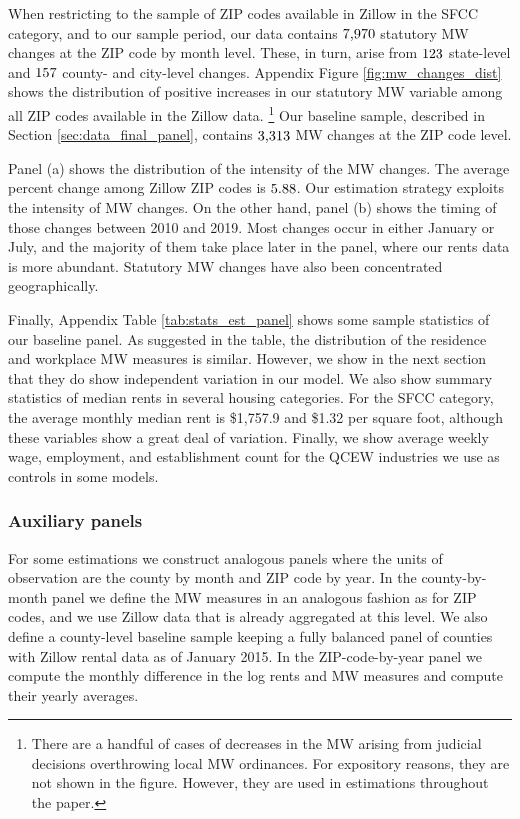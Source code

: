When restricting 
to the sample of ZIP codes available in Zillow in the SFCC category, and 
to our sample period, our data contains
$\textnormal{7,970}$ statutory MW changes at the ZIP code by month level.
These, in turn, arise from 
$\textnormal{123}$ state-level and 
$\textnormal{157}$ county- and city-level changes.
Appendix Figure \ref{fig:mw_changes_dist} shows the distribution of positive 
increases in our statutory MW variable among all ZIP codes available in the 
Zillow data.%
\footnote{There are a handful of cases of decreases in the MW arising from 
judicial decisions overthrowing local MW ordinances.
For expository reasons, they are not shown in the figure.
However, they are used in estimations throughout the paper.}
Our baseline sample, described in Section \ref{sec:data_final_panel}, 
contains $\textnormal{3,313}$ MW changes at the ZIP code level.

Panel (a) shows the distribution of the intensity of the MW changes. 
The average percent change among Zillow ZIP codes is $\textnormal{5.88}$.
Our estimation strategy exploits the intensity of MW changes.
On the other hand, panel (b) shows the timing of those changes between 2010 and 
2019.
Most changes occur in either January or July, and the majority of them take 
place later in the panel, where our rents data is more abundant.
Statutory MW changes have also been concentrated geographically.

Finally, Appendix Table \ref{tab:stats_est_panel} shows some sample statistics 
of our baseline panel.
As suggested in the table, the distribution of the residence and workplace MW 
measures is similar.
However, we show in the next section that they do show independent variation
in our model.
We also show summary statistics of median rents in several housing categories.
For the SFCC category, the average monthly median rent is \$1,757.9 and \$1.32 
per square foot, although these variables show a great deal of variation.
Finally, we show average weekly wage, employment, and establishment count 
for the QCEW industries we use as controls in some models.

\subsubsection*{Auxiliary panels}
\label{sec:data_aux_panels}

For some estimations we construct analogous panels where the units of 
observation are the county by month and ZIP code by year.
In the county-by-month panel we define the MW measures in an analogous fashion 
as for ZIP codes, and we use Zillow data that is already aggregated at this 
level.
We also define a county-level baseline sample keeping a fully balanced panel of 
counties with Zillow rental data as of January 2015.
In the ZIP-code-by-year panel we compute the monthly difference in the log rents 
and MW measures and compute their yearly averages.

